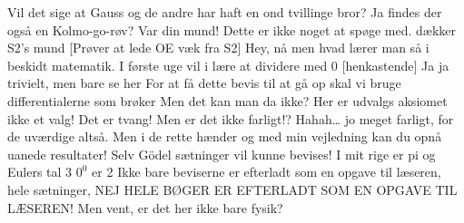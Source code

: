 \documentclass[a4paper,11pt]{article}
\begin{document}
\begin{sketch}
 
 Vil det sige at Gauss og de andre har haft en ond tvillinge bror?
 Ja findes der også en Kolmo-go-røv?
 Var din mund! Dette er ikke noget at spøge med. 
 {dækker S2’s mund}
 
[Prøver at lede OE væk fra S2] Hey, nå men hvad lærer man så i beskidt matematik.
 I første uge vil i lære at dividere med 0
 
[henkastende] Ja ja trivielt, men bare se her
 For at få dette bevis til at gå op skal vi bruge differentialerne som brøker
 Men det kan man da ikke?
 Her er udvalgs aksiomet ikke et valg! Det er tvang!
 Men er det ikke farligt!?
 Hahah… jo meget farligt, for de uværdige altså. Men i de rette hænder og med min vejledning kan du opnå uanede resultater! Selv Gödel sætninger vil kunne bevises!
 I mit rige er pi og Eulers tal 3
 $0^0$ er 2
 Ikke bare beviserne er efterladt som en opgave til læseren, hele sætninger, NEJ HELE BØGER ER EFTERLADT SOM EN OPGAVE TIL LÆSEREN!
 Men vent, er det her ikke bare fysik?
\end{sketch}
\end{document}
